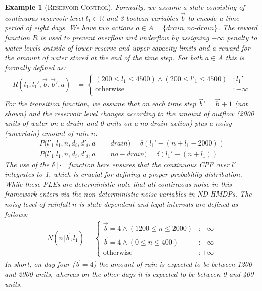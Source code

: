 \documentclass[letterpaper]{article}
\newtheorem*{example*}{Example}
\begin{document}
\begin{example*}[\textsc{Reservoir Control}]
Formally, we assume a state consisting of continuous reservoir level $l_1 \in \mathbb{R}$
and 3 boolean variables $\vec{b}$ to encode a time period of eight days.  We have
two actions $a \in A = \{ \mathit{drain}, \mathit{no}\text{-}\mathit{drain} \}$.
The reward function $R$ is used to prevent overflow and underflow by assigning
$-\infty$ penalty to water levels outside of lower reserve and upper
capacity limits and a reward for the amount of water stored at the end of
the time step.  For both $a \in A$ this is formally defined as:
\vspace{-2mm} 
{\footnotesize
\begin{align*}
R(l_1,l_1',\vec{b},\vec{b}',a) &= 
\begin{cases}
(200 \! \leq \! l_1 \! \leq \! 4500) \wedge (200 \! \leq \! l'_1 \! \leq \! 4500) & \!\! : l_1'\\
\text{otherwise} & \!\! : -\infty\\
\end{cases}
\end{align*}
}
For the transition function, we assume that on each time step $\vec{b}' = \vec{b} + 1$ (not shown)
and the reservoir level changes according to the amount of outflow (2000 units of water on a
$\mathit{drain}$ and 0 units on a $\mathit{no}$-$\mathit{drain}$ action)
plus a noisy (uncertain) amount of rain $n$:
{\footnotesize
\begin{align*}
P(l'_1|l_1,n,d_i,d'_i, a& =\mathit{drain}) = \delta \left( l_1'  - (n + l_1 - 2000) \right) \\
P(l'_1|l_1,n,d_i,d'_i, a&=\mathit{no}-\mathit{drain}) =\delta \left( l_1'  -  (n + l_1) \right)
\end{align*}}
The use of the $\delta[\cdot]$ function here ensures that the continuous CPF over $l'$ integrates to 1,
which is crucial for defining a proper probability distribution.  While these PLEs are deterministic
note that all continuous noise in this framework enters via the non-deterministic noise variables
in ND-HMDPs.  The noisy level of rainfall $n$ is state-dependent and legal intervals are defined as follows:
{\footnotesize
\begin{align*}
N(n|\vec{b},l_1) = \begin{cases}
\vec{b} = 4 \wedge (1200 \leq n \leq 2000) &: -\infty \\
\vec{b} = 4  \wedge (0 \leq n \leq 400)&: -\infty \\
\text{otherwise} &: +\infty
\end{cases}
\end{align*}}
In short, on day four ($\vec{b} = 4$) the amount of rain is expected to be between
1200 and 2000 units, whereas on the other days it is expected to be between 0 and 400 units.
\end{example*}
\end{document}

